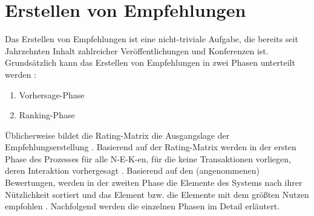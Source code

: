 \section{Erstellen von Empfehlungen}
\label{ch:empfehlungssysteme:empfehlungserstellung}
Das Erstellen von Empfehlungen ist eine nicht-triviale Aufgabe, die bereits seit Jahrzehnten Inhalt zahlreicher Veröffentlichungen und Konferenzen ist.
Grundsätzlich kann das Erstellen von Empfehlungen in zwei Phasen unterteilt werden \cite[S. 898]{adomavicius:article}\cite[S. 854]{adomavicius:4:inbook}\cite[S. 405]{unternährer:article}:
\begin{enumerate}
	\item Vorhersage-Phase
	\item Ranking-Phase
\end{enumerate}

Üblicherweise bildet die Rating-Matrix die Ausgangslage der Empfehlungserstellung \cite[S. 48]{adomavicius:inproceedings:2}.
Basierend auf der Rating-Matrix werden in der ersten Phase des Prozesses für alle \ac{N-E-K}-en, für die keine Transaktionen vorliegen, deren Interaktion vorhergesagt \cite[S. 3]{recommenderSystems:2016}.
Basierend auf den (angenommenen) Bewertungen, werden in der zweiten Phase die Elemente des Systems nach ihrer Nützlichkeit sortiert und das Element bzw. die Elemente mit dem größten Nutzen empfohlen \cite[S. 898]{adomavicius:article}.
Nachfolgend werden die einzelnen Phasen im Detail erläutert.


